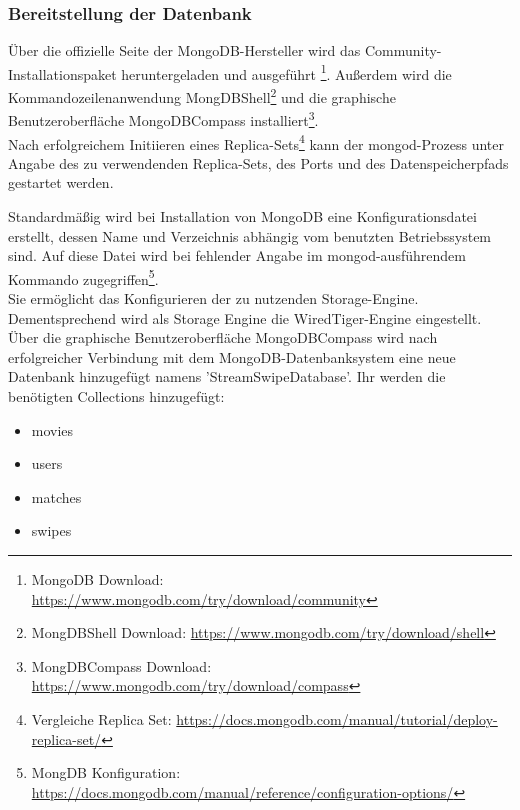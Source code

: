 \subsubsection{Bereitstellung der Datenbank}
Über die offizielle Seite der MongoDB-Hersteller wird das Community-Installationspaket heruntergeladen und ausgeführt \footnote{MongoDB Download: \url{ https://www.mongodb.com/try/download/community}}.
Außerdem wird die Kommandozeilenanwendung MongDBShell\footnote{MongDBShell Download: \url{ https://www.mongodb.com/try/download/shell}} und die
graphische Benutzeroberfläche MongoDBCompass installiert\footnote{MongDBCompass  Download: \url{https://www.mongodb.com/try/download/compass}}.\\
Nach erfolgreichem Initiieren eines Replica-Sets\footnote{Vergleiche Replica Set: \url{https://docs.mongodb.com/manual/tutorial/deploy-replica-set/}}
kann der mongod-Prozess unter Angabe des zu verwendenden Replica-Sets, des Ports und des Datenspeicherpfads gestartet werden. \newline


\noindent
Standardmäßig wird bei Installation von MongoDB eine Konfigurationsdatei erstellt, dessen Name und Verzeichnis abhängig vom benutzten Betriebssystem sind. Auf diese Datei wird bei fehlender Angabe im mongod-ausführendem Kommando zugegriffen\footnote{MongDB Konfiguration: \url{https://docs.mongodb.com/manual/reference/configuration-options/}}.\\
Sie ermöglicht das Konfigurieren der zu nutzenden Storage-Engine. Dementsprechend wird als Storage Engine die WiredTiger-Engine eingestellt. 
Über die graphische Benutzeroberfläche MongoDBCompass wird nach erfolgreicher Verbindung mit dem MongoDB-Datenbanksystem eine neue Datenbank hinzugefügt namens 'StreamSwipeDatabase'. Ihr werden die benötigten Collections hinzugefügt:

\begin{itemize}
\item movies
\item users
\item matches
\item swipes
\end{itemize}


